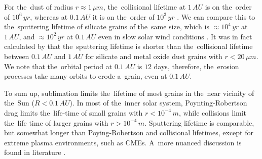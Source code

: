 For the~dust of radius $r \approx 1 \, \si{\mu m}$, the~collisional lifetime at $1\,\si{AU}$ is on the~order of $10^6 \, \si{yr}$, whereas at $0.1\,\si{AU}$ it is on the~order of $10^3 \, \si{yr}$ \citep{grun1985collisional}. We can compare this to the~sputtering lifetime of silicate grains of the~same size, which is $\approx 10^4 \, \si{yr}$ at $1\,\si{AU}$, and $\approx 10^2 \, \si{yr}$ at $0.1\,\si{AU}$ even in slow solar wind conditions \citep{klepper2021influence}. It was in fact calculated by \citet{klepper2021influence} that the~sputtering lifetime is shorter than the~collisional lifetime between $0.1 \, \si{AU}$ and $1 \, \si{AU}$ for silicate and metal oxide dust grains with $r<20 \, \si{\mu m}$. We note that the~orbital period at $0.1\,\si{AU}$ is $12$ days, therefore, the~erosion processes take many orbits to erode a~grain, even at $0.1\,\si{AU}$. 

To sum up, sublimation limits the~lifetime of most grains in the~near vicinity of the~Sun ($R<0.1 \, \si{AU}$). In most of the~inner solar system, Poynting-Robertson drag limits the~life-time of small grains with $r<10^{-4} \, \si{m}$, while collisions limit the~life time of larger grains with $r>10^{-4} \, \si{m}$. Sputtering lifetime is comparable, but somewhat longer than Poying-Robertson and collisional lifetimes, except for extreme plasma environments, such as CMEs. A~more nuanced discussion is found in literature \citep{klepper2021influence,baumann2020dust,grun1985collisional,whipple1967maintaining,myrvang2018temperature}.  